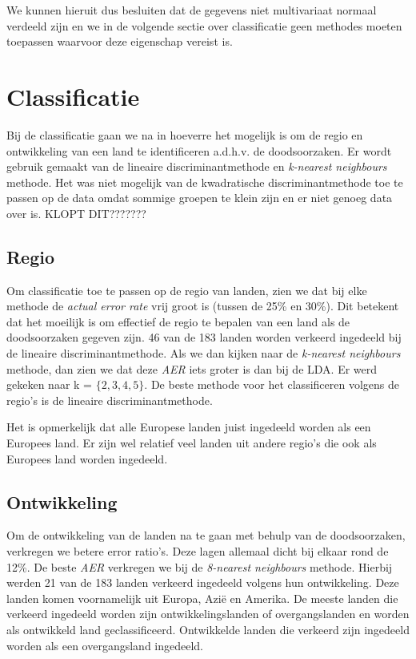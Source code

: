 \documentclass[a4paper,kulak]{kulakarticle}
\begin{document}
We kunnen hieruit dus besluiten dat de gegevens niet multivariaat normaal verdeeld zijn en we in de volgende sectie over classificatie geen methodes moeten toepassen waarvoor deze eigenschap vereist is. 


\section{Classificatie}
Bij de classificatie gaan we na in hoeverre het mogelijk is om de regio en ontwikkeling van een land te identificeren a.d.h.v. de doodsoorzaken. Er wordt gebruik gemaakt van de lineaire discriminantmethode en \textit{k-nearest neighbours} methode. Het was niet mogelijk van de kwadratische discriminantmethode toe te passen op de data omdat sommige groepen te klein zijn en er niet genoeg data over is. KLOPT DIT???????

\subsection{Regio}
Om classificatie toe te passen op de regio van landen, zien we dat bij elke methode de \textit{actual error rate} vrij groot is (tussen de 25\% en 30\%). Dit betekent dat het moeilijk is om effectief de regio te bepalen van een land als de doodsoorzaken gegeven zijn. 46 van de 183 landen worden verkeerd ingedeeld bij de lineaire discriminantmethode. Als we dan kijken naar de \textit{k-nearest neighbours} methode, dan zien we dat deze \textit{AER} iets groter is dan bij de LDA. Er werd gekeken naar k = $\{2,3,4,5\}$. De beste methode voor het classificeren volgens de regio's is de lineaire discriminantmethode. 

Het is opmerkelijk dat alle Europese landen juist ingedeeld worden als een Europees land. Er zijn wel relatief veel landen uit andere regio's die ook als Europees land worden ingedeeld. 

\subsection{Ontwikkeling}
Om de ontwikkeling van de landen na te gaan met behulp van de doodsoorzaken, verkregen we betere error ratio's. Deze lagen allemaal dicht bij elkaar rond de 12\%. De beste \textit{AER} verkregen we bij de \textit{8-nearest neighbours} methode. Hierbij werden 21 van de 183 landen verkeerd ingedeeld volgens hun ontwikkeling. Deze landen komen voornamelijk uit Europa, Azi\"e en Amerika. De meeste landen die verkeerd ingedeeld worden zijn ontwikkelingslanden of overgangslanden en worden als ontwikkeld land geclassificeerd. Ontwikkelde landen die verkeerd zijn ingedeeld worden als een overgangsland ingedeeld. 
\end{document}
